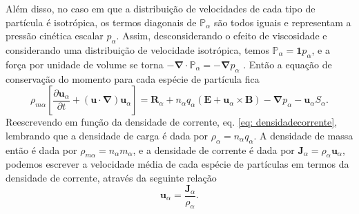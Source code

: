 \documentclass[12pt,oneside,a4paper]{abntex2}
\begin{document}
Além disso, no caso em que a distribuição de velocidades de cada tipo de partícula é isotrópica, os termos diagonais de $\mathbb{P}_\alpha$ são todos iguais e representam a pressão cinética escalar $p_\alpha$. 
Assim, desconsiderando o efeito de viscosidade e considerando uma distribuição de velocidade isotrópica, temos $\mathbb{P}_\alpha =  \mathbf{1} p_\alpha$, e a força por unidade de volume se torna $-\bm{\nabla} \cdot \mathbb{P}_\alpha = -\bm{\nabla} p_\alpha$ \cite[cap 6]{bittencourt}. Então a equação de conservação do momento para cada espécie de partícula fica
\begin{equation}
\label{eq: pit23.1}
\rho_{m\alpha} \left[\frac{\partial \bm{u}_\alpha}{\partial t} + (\bm{u} \cdot \bm{\nabla})\bm{u}_\alpha \right] =  \bm{R}_\alpha+n_\alpha q_\alpha (\bm{E} + \bm{u}_\alpha \times \bm{B}) -\bm{\nabla} p_\alpha - \bm{u}_\alpha S_\alpha.
\end{equation}
Reescrevendo em função da densidade de corrente, eq. \ref{eq: densidadecorrente}, lembrando que a densidade de carga é dada por $\rho_\alpha=n_\alpha q_\alpha$. 
A densidade de massa então é dada por $\rho_{m\alpha} = n_\alpha m_\alpha$, e a densidade de corrente é dada por $\bm{J}_\alpha=\rho_\alpha \bm{u}_\alpha$, podemos escrever a velocidade média de cada espécie de partículas em termos da densidade de corrente, através da seguinte relação
\begin{equation}
\bm{u}_\alpha=\frac{\bm{J}_\alpha}{\rho_\alpha}.
\end{equation}
\end{document}
